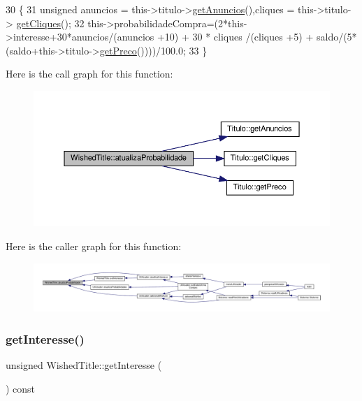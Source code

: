 \begin{DoxyCode}
30                                                   \{
31     \textcolor{keywordtype}{unsigned} anuncios = this->titulo->\hyperlink{classTitulo_ad36afe75694812eabe74af5fe32ad95b}{getAnuncios}(),cliques = this->titulo->
      \hyperlink{classTitulo_a71d5b5985170de5612ec49c5c955f120}{getCliques}();
32     this->probabilidadeCompra=(2*this->interesse+30*anuncios/(anuncios +10) + 30 * cliques /(cliques +5) + 
      saldo/(5*(saldo+this->titulo->\hyperlink{classTitulo_a93725bdc2e98350e47b54fd76c0fa236}{getPreco}())))/100.0;
33 \}
\end{DoxyCode}
Here is the call graph for this function\+:
\nopagebreak
\begin{figure}[H]
\begin{center}
\leavevmode
\includegraphics[width=350pt]{classWishedTitle_a8be5446371add65ba4de2c69c84cb387_cgraph}
\end{center}
\end{figure}
Here is the caller graph for this function\+:
\nopagebreak
\begin{figure}[H]
\begin{center}
\leavevmode
\includegraphics[width=350pt]{classWishedTitle_a8be5446371add65ba4de2c69c84cb387_icgraph}
\end{center}
\end{figure}
\mbox{\label{classWishedTitle_af436ada1ae78a4ffc8031863c0f21859}} 
\subsubsection{\texorpdfstring{get\+Interesse()}{getInteresse()}}
{\footnotesize\ttfamily unsigned Wished\+Title\+::get\+Interesse (\begin{DoxyParamCaption}{ }\end{DoxyParamCaption}) const\hspace{0.3cm}{\ttfamily [inline]}}



